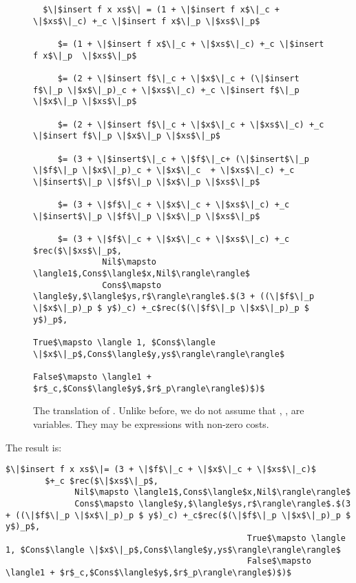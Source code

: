 \begin{figure}[H]
  \caption{The translation of .
  Unlike before, we do not assume that , ,  are variables.
  They may be expressions with non-zero costs.}
  \label{fig:insert_applied}
  \begin{lstlisting}
  $\|$insert f x xs$\| = (1 + \|$insert f x$\|_c + \|$xs$\|_c) +_c \|$insert f x$\|_p \|$xs$\|_p$

     $= (1 + \|$insert f x$\|_c + \|$xs$\|_c) +_c \|$insert f x$\|_p  \|$xs$\|_p$

     $= (2 + \|$insert f$\|_c + \|$x$\|_c + (\|$insert f$\|_p \|$x$\|_p)_c + \|$xs$\|_c) +_c \|$insert f$\|_p \|$x$\|_p \|$xs$\|_p$

     $= (2 + \|$insert f$\|_c + \|$x$\|_c + \|$xs$\|_c) +_c \|$insert f$\|_p \|$x$\|_p \|$xs$\|_p$

     $= (3 + \|$insert$\|_c + \|$f$\|_c+ (\|$insert$\|_p \|$f$\|_p \|$x$\|_p)_c + \|$x$\|_c  + \|$xs$\|_c) +_c \|$insert$\|_p \|$f$\|_p \|$x$\|_p \|$xs$\|_p$

     $= (3 + \|$f$\|_c + \|$x$\|_c + \|$xs$\|_c) +_c \|$insert$\|_p \|$f$\|_p \|$x$\|_p \|$xs$\|_p$

     $= (3 + \|$f$\|_c + \|$x$\|_c + \|$xs$\|_c) +_c $rec($\|$xs$\|_p$,
              Nil$\mapsto \langle1$,Cons$\langle$x,Nil$\rangle\rangle$
              Cons$\mapsto \langle$y,$\langle$ys,r$\rangle\rangle$.$(3 + ((\|$f$\|_p \|$x$\|_p)_p $ y$)_c) +_c$rec($(\|$f$\|_p \|$x$\|_p)_p $ y$)_p$,
                                                 True$\mapsto \langle 1, $Cons$\langle \|$x$\|_p$,Cons$\langle$y,ys$\rangle\rangle\rangle$
                                                 False$\mapsto \langle1 + $r$_c,$Cons$\langle$y$,$r$_p\rangle\rangle$)$)$
  \end{lstlisting}
\end{figure}
%
The result is:
%
\begin{lstlisting}
$\|$insert f x xs$\|= (3 + \|$f$\|_c + \|$x$\|_c + \|$xs$\|_c)$
        $+_c $rec($\|$xs$\|_p$,
              Nil$\mapsto \langle1$,Cons$\langle$x,Nil$\rangle\rangle$
              Cons$\mapsto \langle$y,$\langle$ys,r$\rangle\rangle$.$(3 + ((\|$f$\|_p \|$x$\|_p)_p $ y$)_c) +_c$rec($(\|$f$\|_p \|$x$\|_p)_p $ y$)_p$,
                                                 True$\mapsto \langle 1, $Cons$\langle \|$x$\|_p$,Cons$\langle$y,ys$\rangle\rangle\rangle$
                                                 False$\mapsto \langle1 + $r$_c,$Cons$\langle$y$,$r$_p\rangle\rangle$)$)$
\end{lstlisting}
%


